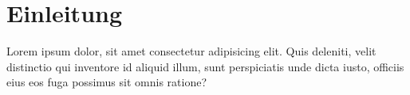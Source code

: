 \section{Einleitung}
Lorem ipsum dolor, sit amet consectetur adipisicing elit.
Quis deleniti, velit distinctio qui inventore id aliquid illum,
sunt perspiciatis unde dicta iusto, officiis eius eos fuga possimus sit omnis ratione?
